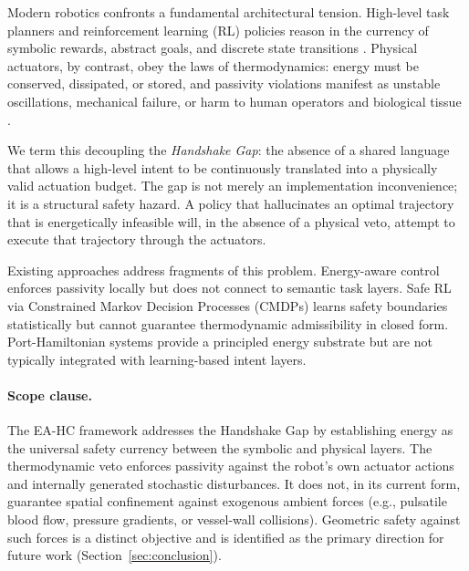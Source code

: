 \documentclass[11pt]{article}
\begin{document}
Modern robotics confronts a fundamental architectural tension. High-level task planners and
reinforcement learning (RL) policies reason in the currency of symbolic rewards, abstract
goals, and discrete state transitions \cite{kober2013,levine2016}. Physical actuators, by contrast, obey the laws of
thermodynamics: energy must be conserved, dissipated, or stored, and passivity violations
manifest as unstable oscillations, mechanical failure, or harm to human operators and biological
tissue \cite{vanderschaft2014,ferraguti2013}.

We term this decoupling the \emph{Handshake Gap}: the absence of a shared language that allows a
high-level intent to be continuously translated into a physically valid actuation budget. The
gap is not merely an implementation inconvenience; it is a structural safety hazard. A policy
that hallucinates an optimal trajectory that is energetically infeasible will, in the absence of a
physical veto, attempt to execute that trajectory through the actuators.

Existing approaches address fragments of this problem. Energy-aware control \cite{ferraguti2015,schindlbeck2015} enforces
passivity locally but does not connect to semantic task layers. Safe RL via Constrained Markov
Decision Processes (CMDPs) \cite{garcia2015,altman1999} learns safety boundaries statistically but cannot guarantee
thermodynamic admissibility in closed form. Port-Hamiltonian systems \cite{vanderschaft1995,maschke1992} provide a principled
energy substrate but are not typically integrated with learning-based intent layers.

\paragraph{Scope clause.} The EA-HC framework addresses the Handshake Gap by establishing energy as
the universal safety currency between the symbolic and physical layers. The thermodynamic veto
enforces passivity against the robot's own actuator actions and internally generated stochastic
disturbances. It does not, in its current form, guarantee spatial confinement against exogenous
ambient forces (e.g., pulsatile blood flow, pressure gradients, or vessel-wall collisions). Geometric
safety against such forces is a distinct objective and is identified as the primary direction for
future work (Section~\ref{sec:conclusion}).
\end{document}
